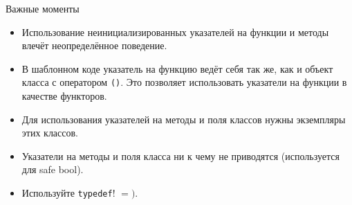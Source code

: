 \documentclass{beamer}
\begin{document}
\begin{frame}[fragile]{Важные моменты}
\begin{itemize}
    \item Использование неинициализированных указателей на функции и методы
        влечёт неопределённое поведение.

    \item В шаблонном коде указатель на функцию ведёт себя так же, как
        и объект класса с оператором \texttt{()}. Это позволяет использовать
        указатели на функции в качестве функторов.

    \item Для использования указателей на методы и поля классов нужны экземпляры
        этих классов.

    \item Указатели на методы и поля класса ни к чему не приводятся
        (используется для safe bool).

    \item Используйте \texttt{typedef}! $=)$.
\end{itemize}
\end{frame}
\end{document}
